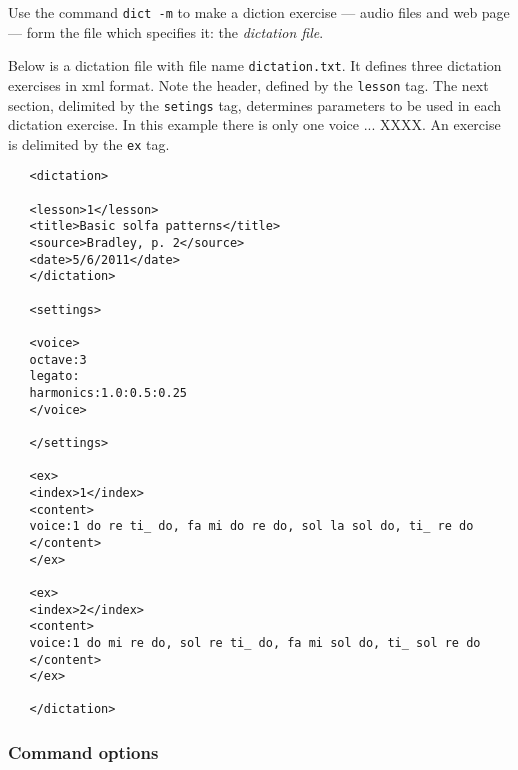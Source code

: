 \documentclass[11pt]{amsart}
\begin{document}
Use the command {\tt dict -m} to make a diction exercise --- audio files
and web page --- form the file which specifies it: the \emph{dictation file}.

Below is a dictation file with file name {\tt dictation.txt}.  It defines
three dictation exercises in xml format.  Note the header, defined by the 
{\tt lesson} tag.  The next section, delimited by the {\tt setings} tag,
determines parameters to be used in each dictation exercise.  In this
example there is only one voice ... XXXX.  An exercise is delimited by the 
{\tt ex} tag.

\begin{verbatim}
   <dictation>
   
   <lesson>1</lesson>
   <title>Basic solfa patterns</title>
   <source>Bradley, p. 2</source>
   <date>5/6/2011</date>
   </dictation>
   
   <settings>
   
   <voice>
   octave:3
   legato:
   harmonics:1.0:0.5:0.25
   </voice>
   
   </settings>
   
   <ex>
   <index>1</index>
   <content>
   voice:1 do re ti_ do, fa mi do re do, sol la sol do, ti_ re do
   </content>
   </ex>
   
   <ex>
   <index>2</index>
   <content>
   voice:1 do mi re do, sol re ti_ do, fa mi sol do, ti_ sol re do
   </content>
   </ex>
   
   </dictation>
\end{verbatim}

\subsubsection{Command options}
\end{document}
